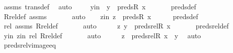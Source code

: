\begin{isabellebody}
\ assms\ trans{\isacharunderscore}{\kern0pt}def\ \isamarkupfalse%
\ auto\ \isanewline
\isanewline
\ \ \isamarkupfalse%
\ yin\ {\isacharcolon}{\kern0pt}\ {\isachardoublequoteopen}y\ {\isasymin}\ preds{\isacharparenleft}{\kern0pt}R{\isacharcomma}{\kern0pt}\ x{\isacharparenright}{\kern0pt}{\isachardoublequoteclose}\ \isanewline
\ \ \ \ \isamarkupfalse%
\ preds{\isacharunderscore}{\kern0pt}def\isanewline
\ \ \ \ \isamarkupfalse%
\ Rrel{\isacharunderscore}{\kern0pt}def\ assms\ \isanewline
\ \ \ \ \isamarkupfalse%
\ auto\isanewline
\ \ \isamarkupfalse%
\ zin{\isacharcolon}{\kern0pt}\ {\isachardoublequoteopen}z\ {\isasymin}\ preds{\isacharparenleft}{\kern0pt}R{\isacharcomma}{\kern0pt}\ x{\isacharparenright}{\kern0pt}{\isachardoublequoteclose}\isanewline
\ \ \ \ \isamarkupfalse%
\ preds{\isacharunderscore}{\kern0pt}def\ \isanewline
\ \ \ \ \isamarkupfalse%
\ rel{\isacharprime}{\kern0pt}\ assms\ Rrel{\isacharunderscore}{\kern0pt}def\ \isanewline
\ \ \ \ \isamarkupfalse%
\ auto\isanewline
\isanewline
\ \ \isamarkupfalse%
\ \isamarkupfalse%
\ {\isachardoublequoteopen}{\isacharless}{\kern0pt}z{\isacharcomma}{\kern0pt}\ y{\isachargreater}{\kern0pt}\ {\isasymin}\ preds{\isacharunderscore}{\kern0pt}rel{\isacharparenleft}{\kern0pt}R{\isacharcomma}{\kern0pt}\ x{\isacharparenright}{\kern0pt}{\isachardoublequoteclose}\ \isanewline
\ \ \ \ \isamarkupfalse%
\ preds{\isacharunderscore}{\kern0pt}rel{\isacharunderscore}{\kern0pt}def\ \isanewline
\ \ \ \ \isamarkupfalse%
\ yin\ zin\ rel\ Rrel{\isacharunderscore}{\kern0pt}def\ \isanewline
\ \ \ \ \isamarkupfalse%
\ auto\isanewline
\ \ \isamarkupfalse%
\ \isamarkupfalse%
\ {\isachardoublequoteopen}z\ {\isasymin}\ preds{\isacharunderscore}{\kern0pt}rel{\isacharparenleft}{\kern0pt}R{\isacharcomma}{\kern0pt}\ x{\isacharparenright}{\kern0pt}\ {\isacharminus}{\kern0pt}{\isacharbackquote}{\kern0pt}{\isacharbackquote}{\kern0pt}\ {\isacharbraceleft}{\kern0pt}y{\isacharbraceright}{\kern0pt}{\isachardoublequoteclose}\ \isamarkupfalse%
\ auto\isanewline
{}\isamarkupfalse%
%
\endisatagproof
{\isafoldproof}%
%
\isadelimproof
\isanewline
%
\endisadelimproof
\isanewline
{}\isamarkupfalse%
\ preds{\isacharunderscore}{\kern0pt}rel{\isacharunderscore}{\kern0pt}vimage{\isacharunderscore}{\kern0pt}eq{\isacharprime}{\kern0pt}\ {\isacharcolon}{\kern0pt}\ \isanewline

\end{isabellebody}
